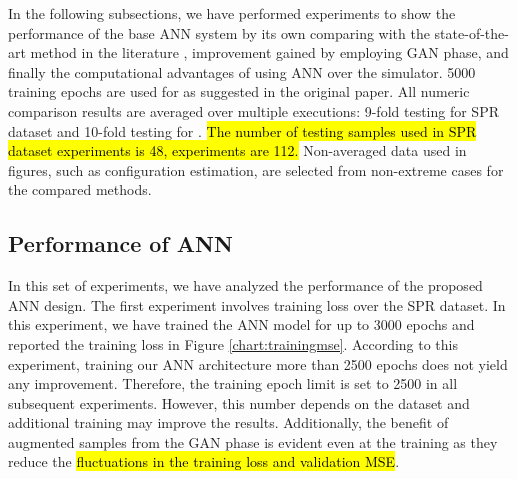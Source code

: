 \documentclass[journal]{IEEEtran}
\begin{document}
In the following subsections, we have performed experiments to show the performance of the base ANN system by its own comparing with the state-of-the-art method in the literature \cite{paper0}, improvement gained by employing GAN phase, and finally the computational advantages of using ANN over the simulator. 5000 training epochs are used for  \cite{paper0} as suggested in the original paper. All numeric comparison results are averaged over multiple executions: 9-fold testing for SPR dataset and 10-fold testing for \dszero. \hl{The number of testing samples used in SPR dataset experiments is 48, \dszero{} experiments are 112.} Non-averaged data used in figures, such as configuration estimation, are selected from non-extreme cases for the compared methods.
%
%

\subsection{Performance of ANN}

In this set of experiments, we have analyzed the performance of the proposed ANN design. The first experiment involves training loss over the SPR dataset. In this experiment, we have trained the ANN model for up to 3000 epochs and reported the training loss in Figure \ref{chart:trainingmse}. According to this experiment, training our ANN architecture more than 2500 epochs does not yield any improvement. Therefore, the training epoch limit is set to 2500 in all subsequent experiments. However, this number depends on the dataset and additional training may improve the results. Additionally, the benefit of augmented samples from the GAN phase is evident even at the training as they reduce the \hl{fluctuations in the training loss and validation MSE}.
\end{document}
